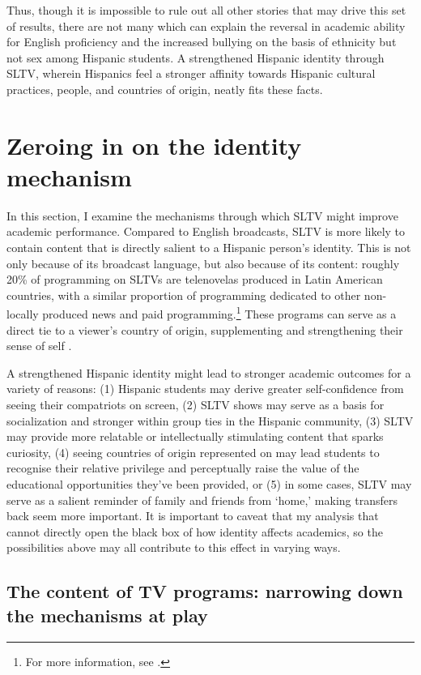 \documentclass[11pt]{article}
\begin{document}
Thus, though it is impossible to rule out all other stories that may drive this set of results, there are not many which can explain the reversal in academic ability for English proficiency and the increased bullying on the basis of ethnicity but not sex among Hispanic students. A strengthened Hispanic identity through SLTV, wherein Hispanics feel a stronger affinity towards Hispanic cultural practices, people, and countries of origin, neatly fits these facts.



\section{Zeroing in on the identity mechanism}\label{s:mech}

In this section, I examine the mechanisms through which SLTV might improve academic performance. Compared to English broadcasts, SLTV is more likely to contain content that is directly salient to a Hispanic person's identity. This is not only because of its broadcast language, but also because of its content: roughly 20\% of programming on SLTVs are telenovelas produced in Latin American countries, with a similar proportion of programming dedicated to other non-locally produced news and paid programming.\footnote{ For more information, see \cite{noauthor_hispanic_2016}. } These programs can serve as a direct tie to a viewer's country of origin, supplementing and strengthening their sense of self \citep{morales2016television}. 

A strengthened Hispanic identity might lead to stronger academic outcomes for a variety of reasons: (1) Hispanic students may derive greater self-confidence from seeing their compatriots on screen, (2) SLTV shows may serve as a basis for socialization and stronger within group ties in the Hispanic community, (3) SLTV may provide more relatable or intellectually stimulating content that sparks curiosity, (4) seeing countries of origin represented on may lead students to recognise their relative privilege and perceptually raise the value of the educational opportunities they've been provided, or (5) in some cases, SLTV may serve as a salient reminder of family and friends from `home,' making transfers back seem more important. It is important to caveat that my analysis that cannot directly open the black box of how identity affects academics, so the possibilities above may all contribute to this effect in varying ways.


\subsection{The content of TV programs: narrowing down the mechanisms at play} \label{s:transcripts}
\end{document}
